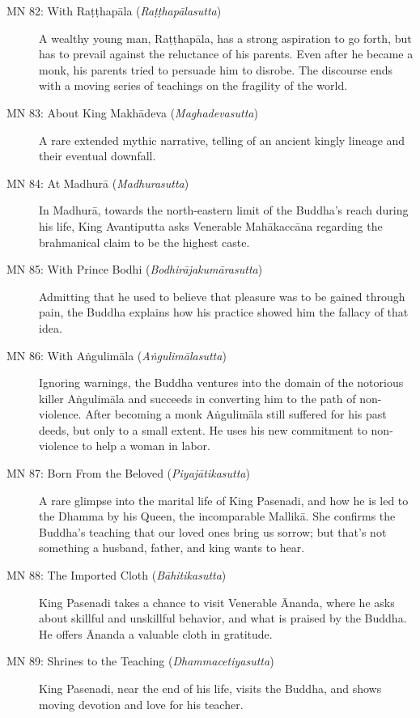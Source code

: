 \documentclass[12pt,openany]{book}%
\begin{document}
\begin{description}
\item[MN 82: With \textsanskrit{Raṭṭhapāla} (\textit{\textsanskrit{Raṭṭhapālasutta}})] A wealthy young man, \textsanskrit{Raṭṭhapāla}, has a strong aspiration to go forth, but has to prevail against the reluctance of his parents. Even after he became a monk, his parents tried to persuade him to disrobe. The discourse ends with a moving series of teachings on the fragility of the world.%
\item[MN 83: About King \textsanskrit{Makhādeva} (\textit{\textsanskrit{Maghadevasutta}})] A rare extended mythic narrative, telling of an ancient kingly lineage and their eventual downfall.%
\item[MN 84: At \textsanskrit{Madhurā} (\textit{\textsanskrit{Madhurasutta}})] In \textsanskrit{Madhurā}, towards the north-eastern limit of the Buddha’s reach during his life, King Avantiputta asks Venerable \textsanskrit{Mahākaccāna} regarding the brahmanical claim to be the highest caste.%
\item[MN 85: With Prince Bodhi (\textit{\textsanskrit{Bodhirājakumārasutta}})] Admitting that he used to believe that pleasure was to be gained through pain, the Buddha explains how his practice showed him the fallacy of that idea.%
\item[MN 86: With \textsanskrit{Aṅgulimāla} (\textit{\textsanskrit{Aṅgulimālasutta}})] Ignoring warnings, the Buddha ventures into the domain of the notorious killer \textsanskrit{Aṅgulimāla} and succeeds in converting him to the path of non-violence. After becoming a monk \textsanskrit{Aṅgulimāla} still suffered for his past deeds, but only to a small extent. He uses his new commitment to non-violence to help a woman in labor.%
\item[MN 87: Born From the Beloved (\textit{\textsanskrit{Piyajātikasutta}})] A rare glimpse into the marital life of King Pasenadi, and how he is led to the Dhamma by his Queen, the incomparable \textsanskrit{Mallikā}. She confirms the Buddha’s teaching that our loved ones bring us sorrow; but that’s not something a husband, father, and king wants to hear.%
\item[MN 88: The Imported Cloth (\textit{\textsanskrit{Bāhitikasutta}})] King Pasenadi takes a chance to visit Venerable Ānanda, where he asks about skillful and unskillful behavior, and what is praised by the Buddha. He offers Ānanda a valuable cloth in gratitude.%
\item[MN 89: Shrines to the Teaching (\textit{\textsanskrit{Dhammacetiyasutta}})] King Pasenadi, near the end of his life, visits the Buddha, and shows moving devotion and love for his teacher.%

\end{description}
\end{document}
